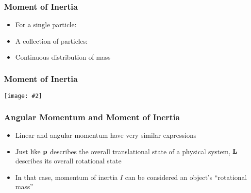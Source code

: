 \documentclass[12pt,compress,aspectratio=169]{beamer}
\newcommand{\pic}[2]{\texttt{[image: \#2]}}
\newcommand{\mb}[1]{\ensuremath\mathbf{#1}}
\begin{document}
\begin{frame}
  \frametitle{Moment of Inertia}
  \begin{itemize}
  \item For a single particle:
    
  \item A collection of particles:

  \item Continuous distribution of mass

  \end{itemize}
\end{frame}


\begin{frame}
  \frametitle{Moment of Inertia}
  \begin{center}
    \pic{.7}{mic.png}
  \end{center}
\end{frame}

\begin{frame}
  \frametitle{Angular Momentum and Moment of Inertia}
  \begin{itemize}
  \item Linear and angular momentum have very similar expressions
    
    \vspace{-0.25in}{\Large
      \begin{displaymath}
        \mb{p}=m\mb{v}\quad\quad\quad \mb{L}=I\bm{\omega}
      \end{displaymath}
    }
  \item Just like $\mb{p}$ describes the overall translational state of a
    physical system, $\mb{L}$ describes its overall rotational state
  \item In that case, momentum of inertia $I$ can be considered an object's
    ``rotational mass''
  \end{itemize}
\end{frame}
\end{document}
